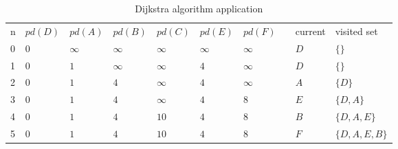 \documentclass[a4paper,11pt]{report}
\begin{document}
\begin{table}[h]
\centering
\caption{Dijkstra algorithm application}
\label{my-label}
\begin{tabular}{llllllllll}
\cline{1-7} \cline{9-10}
\multicolumn{1}{|l|}{n} & \multicolumn{1}{l|}{$pd(D)$} & \multicolumn{1}{l|}{$pd(A)$} & \multicolumn{1}{l|}{$pd(B)$} & \multicolumn{1}{l|}{$pd(C)$} & \multicolumn{1}{l|}{$pd(E)$} & \multicolumn{1}{l|}{$pd(F)$} & \multicolumn{1}{l|}{} & \multicolumn{1}{l|}{current} & \multicolumn{1}{l|}{visited set} \\ \cline{1-7} \cline{9-10} 
\multicolumn{1}{|l|}{0} & $0$                          & $\infty$                     & $\infty$                     & $\infty$                     & $\infty$                     & $\infty$                     &                       & $D$                          & $\{\}$                           \\ \cline{1-1}
\multicolumn{1}{|l|}{1} & $0$                          & $1$                          & $\infty$                     & $\infty$                     & $4$                          & $\infty$                     &                       & $D$                          & $\{\}$                           \\ \cline{1-1}
\multicolumn{1}{|l|}{2} & $0$                          & $1$                          & $4$                          & $\infty$                     & $4$                          & $\infty$                     &                       & $A$                          & $\{D\}$                          \\ \cline{1-1}
\multicolumn{1}{|l|}{3} & $0$                          & $1$                          & $4$                          & $\infty$                     & $4$                          & $8$                          &                       & $E$                          & $\{D,A\}$                        \\ \cline{1-1}
\multicolumn{1}{|l|}{4} & $0$                          & $1$                          & $4$                          & $10$                         & $4$                          & $8$                          &                       & $B$                          & $\{D,A,E\}$                      \\ \cline{1-1}
\multicolumn{1}{|l|}{5} & $0$                          & $1$                          & $4$                          & $10$                         & $4$                          & $8$                          &                       & $F$                          & $\{D,A,E,B\}$                    \\ \cline{1-1}

\end{tabular}
\end{table}
\end{document}
